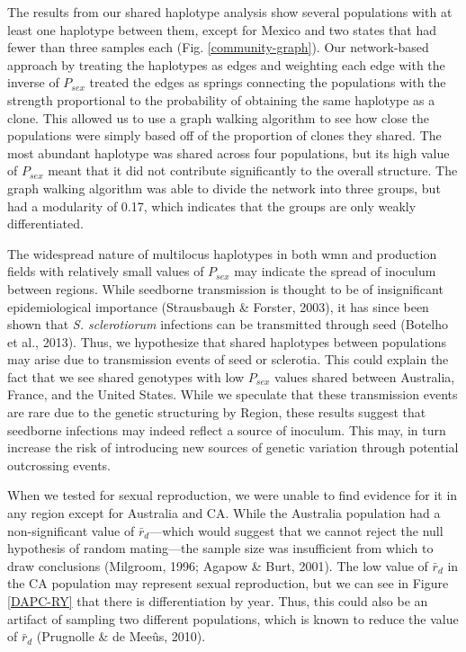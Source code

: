 \documentclass[fleqn,10pt,lineno]{wlpeerj} %
\theoremstyle{definition}
\theoremstyle{definition}
\theoremstyle{definition}
\theoremstyle{remark}
\begin{document}
The results from our shared haplotype analysis show several populations
with at least one haplotype between them, except for Mexico and two
states that had fewer than three samples each (Fig.
\ref{community-graph}). Our network-based approach by treating the
haplotypes as edges and weighting each edge with the inverse of
\(P_{sex}\) treated the edges as springs connecting the populations with
the strength proportional to the probability of obtaining the same
haplotype as a clone. This allowed us to use a graph walking algorithm
to see how close the populations were simply based off of the proportion
of clones they shared. The most abundant haplotype was shared across
four populations, but its high value of \(P_{sex}\) meant that it did
not contribute significantly to the overall structure. The graph walking
algorithm was able to divide the network into three groups, but had a
modularity of 0.17, which indicates that the groups are only weakly
differentiated.

The widespread nature of multilocus haplotypes in both wmn and
production fields with relatively small values of \(P_{sex}\) may
indicate the spread of inoculum between regions. While seedborne
transmission is thought to be of insignificant epidemiological
importance (Strausbaugh \& Forster, 2003), it has since been shown that
\emph{S. sclerotiorum} infections can be transmitted through seed
(Botelho et al., 2013). Thus, we hypothesize that shared haplotypes
between populations may arise due to transmission events of seed or
sclerotia. This could explain the fact that we see shared genotypes with
low \(P_{sex}\) values shared between Australia, France, and the United
States. While we speculate that these transmission events are rare due
to the genetic structuring by Region, these results suggest that
seedborne infections may indeed reflect a source of inoculum. This may,
in turn increase the risk of introducing new sources of genetic
variation through potential outcrossing events.

When we tested for sexual reproduction, we were unable to find evidence
for it in any region except for Australia and CA. While the Australia
population had a non-significant value of \(\bar{r}_d\)---which would
suggest that we cannot reject the null hypothesis of random mating---the
sample size was insufficient from which to draw conclusions (Milgroom,
1996; Agapow \& Burt, 2001). The low value of \(\bar{r}_d\) in the CA
population may represent sexual reproduction, but we can see in Figure
\ref{DAPC-RY} that there is differentiation by year. Thus, this could
also be an artifact of sampling two different populations, which is
known to reduce the value of \(\bar{r}_d\) (Prugnolle \& de Meeûs,
2010).
\end{document}
